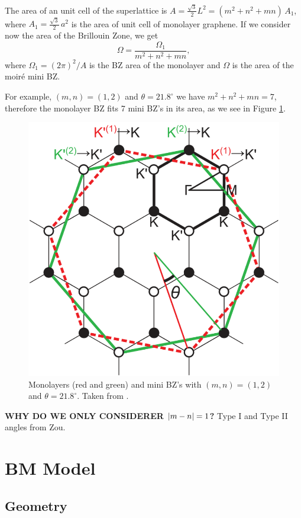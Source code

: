 \n


The area of an unit cell of the superlattice is $A = \frac{\sqrt{3}}{2} L^2 = (m^2 + n^2 + mn) \, A_1$, where $A_1 = \frac{\sqrt{3}}{2} \, a^2$ is the area of unit cell of monolayer graphene. If we consider now the area of the Brillouin Zone, we get
\begin{equation} \label{eq:bz-volume}
\Omega = \frac{\Omega_1}{m^2 + n^2 + mn},
\end{equation}
where $\Omega_1 = (2\pi)^2/A$ is the BZ area of the monolayer and $\Omega$ is the area of the moiré mini BZ.

\n

For example, $(m,n) = (1,2)$ and $\theta = 21.8^\circ$ we have $m^2 + n^2 + mn = 7$, therefore the monolayer BZ fits 7 mini BZ's in its area, as we see in Figure \ref{fig:bzminibz}.
\begin{figure}[H]
\centering
\includegraphics[width=0.5\linewidth]{fig/bzminibz.png}
\caption{Monolayers (red and green) and mini BZ's with $(m,n) = (1,2)$ and $\theta = 21.8^\circ$. Taken from \cite{koshino2012}.}
\label{fig:bzminibz}
\end{figure}

\n

\textbf{WHY DO WE ONLY CONSIDERER $\abs{m-n} = 1$?} Type I and Type II angles from Zou.

\pagebreak

\section{BM Model}

\subsection{Geometry}

